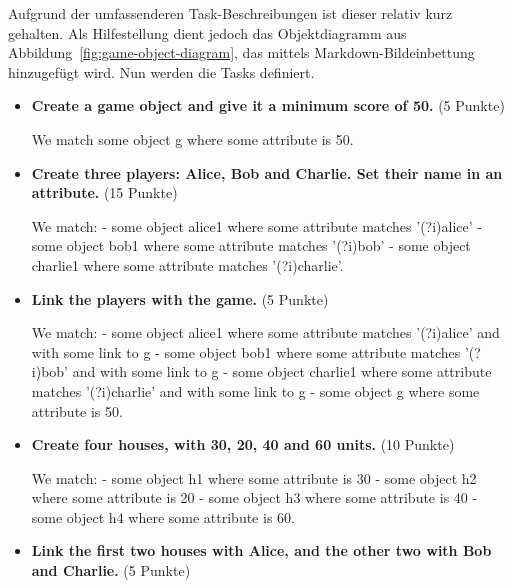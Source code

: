 Aufgrund der umfassenderen Task-Beschreibungen ist dieser relativ kurz gehalten.
Als Hilfestellung dient jedoch das Objektdiagramm aus Abbildung~\ref{fig:game-object-diagram}, das mittels Markdown-Bildeinbettung hinzugefügt wird.
Nun werden die Tasks definiert.

\begin{itemize}
    \item \textbf{Create a game object and give it a minimum score of 50.} (5 Punkte)

    \begin{mdcodeblock}
        We match some object g where some attribute is 50.
    \end{mdcodeblock}

    \item \textbf{Create three players: Alice, Bob and Charlie.
    Set their name in an attribute.} (15 Punkte)

    \begin{mdcodeblock}
        We match:
        - some object alice1 where some attribute matches '(?i)alice'
        - some object bob1 where some attribute matches '(?i)bob'
        - some object charlie1 where some attribute matches '(?i)charlie'.
    \end{mdcodeblock}

    \item \textbf{Link the players with the game.} (5 Punkte)

    \begin{mdcodeblock}
        We match:
        - some object alice1 where some attribute matches '(?i)alice' and with some link to g
        - some object bob1 where some attribute matches '(?i)bob' and with some link to g
        - some object charlie1 where some attribute matches '(?i)charlie' and with some link to g
        - some object g where some attribute is 50.
    \end{mdcodeblock}

    \item \textbf{Create four houses, with 30, 20, 40 and 60 units.} (10 Punkte)

    \begin{mdcodeblock}
        We match:
        - some object h1 where some attribute is 30
        - some object h2 where some attribute is 20
        - some object h3 where some attribute is 40
        - some object h4 where some attribute is 60.
    \end{mdcodeblock}

    \item \textbf{Link the first two houses with Alice, and the other two with Bob and Charlie.} (5 Punkte)


\end{itemize}
